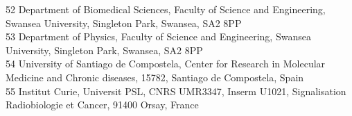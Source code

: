 {\begin{tabbing}
     52 \> Department of Biomedical Sciences, Faculty of Science and Engineering, Swansea University, Singleton Park, Swansea, SA2 8PP\\
     53 \> Department of Physics, Faculty of Science and Engineering, Swansea University, Singleton Park, Swansea, SA2 8PP\\
     54 \> University of Santiago de Compostela, Center for Research in Molecular Medicine and Chronic diseases, 15782, Santiago de Compostela, Spain\\
     55 \> Institut Curie, Universit PSL, CNRS UMR3347, Inserm U1021, Signalisation Radiobiologie et Cancer, 91400 Orsay, France\\
    ~   \> \\
  \end{tabbing}
}
